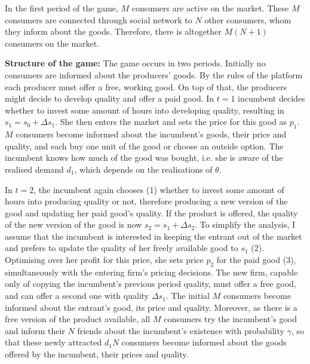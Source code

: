 \documentclass[13pt]{article}
\numberwithin{figure}{section}
\numberwithin{table}{section}
\theoremstyle{indented}
\numberwithin{equation}{section} %
\begin{document}

In the first period of the game, $M$ consumers are active on the market. These $M$ consumers are connected through social network to $N$ other consumers, whom they inform about the goods. Therefore, there is altogether $M(N+1)$ consumers on the market.

\textbf{Structure of the game:}
The game occurs in two periods. Initially no consumers are informed about the producers' goods. By the rules of the platform each producer must offer a free, working good. On top of that, the producers might decide to develop quality and offer a paid good.  In \textbf{$t=1$} incumbent decides whether to invest some amount of hours into developing quality, resulting in $s_1 = s_0+\Delta s_1$. She then enters the market and sets the price for this good as $p_1$. $M$ consumers become informed about the incumbent's goods, their price and quality, and each buy one unit of the good or choose an outside option. The incumbent knows how much of the good was bought, i.e. she is aware of the realised demand $d_1$, which depends on the realisations of $\theta$. 

In \textbf{$t=2$}, the incumbent again chooses (1) whether to invest some amount of hours into producing quality or not, therefore producing a new version of the good and updating her paid good's quality. If the product is offered, the quality of the new version of the good is now  $s_2 = s_1 + \Delta s_2$. To simplify the analysis, I assume that the incumbent is interested in keeping the entrant out of the market and prefers to update the quality of her freely available good to $s_1$ (2). Optimising over her profit for this price, she sets price $p_2$ for the paid good (3), simultaneously with the entering firm's pricing decisions. The new firm, capable only of copying the incumbent's previous period quality, must offer a free good, and can offer a second one with quality $\Delta s_1$. The initial $M$ consumers become informed about the entrant's good, its price and quality. Moreover, as there is a free version of the product available, all $M$ consumers try the incumbent's good and inform their $N$ friends about the incumbent's existence with probability $\gamma$, so that these newly attracted $d_1N$ consumers become informed about the goods offered by the incumbent, their prices and quality.
\end{document}
